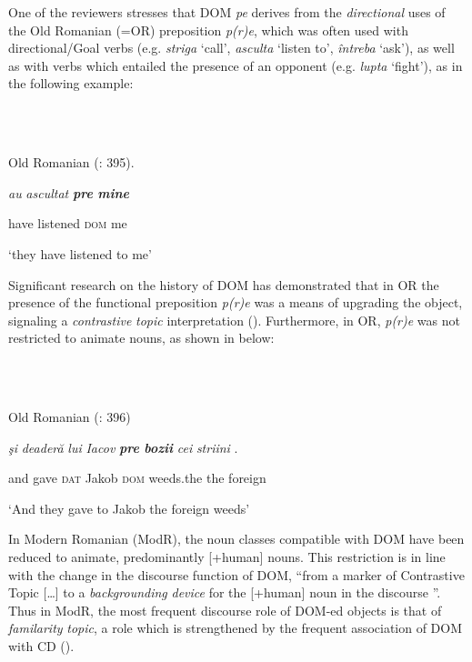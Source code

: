 \documentclass[output=paper,colorlinks,citecolor=brown]{./langscibook}
\begin{document}
One of the reviewers stresses that DOM \textit{pe} derives from the \textit{directional} uses of the Old Romanian (=OR) preposition \textit{p(r)e}, which was often used with directional/Goal verbs (e.g. \textit{striga} ‘call’, \textit{asculta} ‘listen to’, \textit{întreba} ‘ask’), as well as with verbs which entailed the presence of an opponent (e.g. \textit{lupta} ‘fight’), as in the following example: 

\ea%
    \label{ex:key:22}
    \gll\\
        \\
    \glt
    \z

          Old Romanian (\citealt{HillMardale2017}: 395).

\textit{au}  \textit{ascultat}  \textbf{\textit{pre} \textit{mine}}

  have listened   \textsc{dom} me

  ‘they have listened to me’

Significant research on the history of DOM has demonstrated that in OR the presence of the functional preposition \textit{p(r)e} was a means of upgrading the object, signaling a \textit{contrastive} \textit{topic} interpretation (\citealt{Hill2013, HillMardale2017}). Furthermore, in OR, \textit{p(r)e} was not restricted to animate nouns, as shown in  below:

\ea%
    \label{ex:key:23}
    \gll\\
        \\
    \glt
    \z

          Old Romanian  (\citealt{HillMardale2017}: 396)

\textit{şi} \textit{deaderă}  \textit{lui}  \textit{Iacov}\textbf{  \textit{pre} \textit{bozii}  }\textit{cei}  \textit{striini} .

  and gave   \textsc{dat} Jakob  \textsc{dom} weeds.the  the foreign

  ‘And they gave to Jakob the foreign weeds’

In Modern Romanian (ModR), the noun classes compatible with DOM have been reduced to animate, predominantly [+human] nouns. This restriction is in line with the change in the discourse function of DOM, “from a marker of Contrastive Topic […] to a \textit{backgrounding} \textit{device} for the [+human] noun in the discourse \citep[147]{Hill2013}”. Thus in ModR, the most frequent discourse role of DOM-ed objects is that of \textit{familarity} \textit{topic}, a role which is strengthened by the frequent association of DOM with CD (\citealt{HillMardale2017}).
\end{document}
